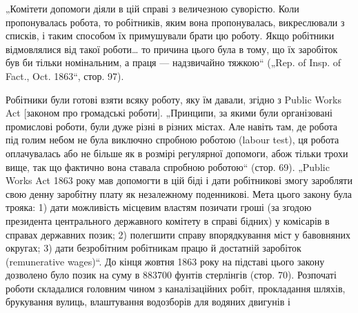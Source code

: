 „Комітети допомоги діяли в цій справі з величезною суворістю.
Коли пропонувалась робота, то робітників, яким вона пропонувалась,
викреслювали з списків, і таким способом їх примушували
брати цю роботу. Якщо робітники відмовлялися від такої роботи\dots{}
то причина цього була в тому, що їх заробіток був би тільки
номінальним, а праця — надзвичайно тяжкою“ („Rep. of Insp. of
Fact., Oct. 1863“, стор. 97).

Робітники були готові взяти всяку роботу, яку їм давали,
згідно з Public Works Act [законом про громадські роботи].
„Принципи, за якими були організовані промислові роботи, були
дуже різні в різних містах. Але навіть там, де робота під голим
небом не була виключно спробною роботою (labour test), ця
робота оплачувалась або не більше як в розмірі регулярної
допомоги, абож тільки трохи вище, так що фактично вона ставала
спробною роботою“ (стор. 69). „Public Works Act 1863 року
мав допомогти в цій біді і дати робітникові змогу заробляти свою
денну заробітну плату як незалежному поденникові. Мета цього
закону була трояка: 1) дати можливість місцевим властям позичати
гроші (за згодою президента центрального державного
комітету в справі бідних) у комісарів в справах державних позик;
2) полегшити справу впорядкування міст у бавовняних округах;
3) дати безробітним робітникам працю й достатній заробіток
(remunerative wages)“. До кінця жовтня 1863 року на підставі
цього закону дозволено було позик на суму в 883700 фунтів
стерлінгів (стор. 70). Розпочаті роботи складалися головним
чином з каналізаційних робіт, прокладання шляхів, брукування
вулиць, влаштування водозборів для водяних двигунів і~

